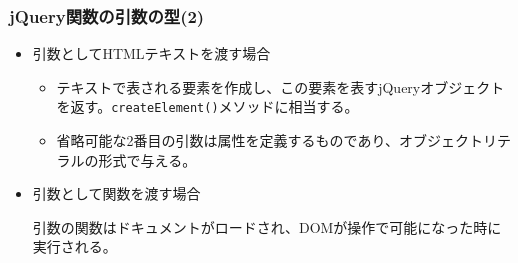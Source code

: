 \begin{frame}[containsverbatim]
\frametitle{jQuery関数の引数の型(2)}
\begin{itemize}
 \item 引数としてHTMLテキストを渡す場合

\begin{itemize}
 \item テキストで表される要素を作成し、この要素を表すjQueryオブジェクト
       を返す。\texttt{createElement()}メソッドに相当する。
 \item 省略可能な2番目の引数は属性を定義するものであり、オブジェクトリテ
       ラルの形式で与える。
\end{itemize}       

 \item 引数として関数を渡す場合

       引数の関数はドキュメントがロードされ、DOMが操作で可能になった時に実行される。
\end{itemize}
\end{frame}

